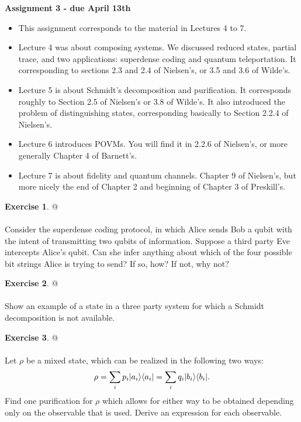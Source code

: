 \documentclass[12pt]{article}
\theoremstyle{plain}
\theoremstyle{definition}
\newtheorem{exerc}{Exercise}
\begin{document}
\begin{center}
\Large \textbf{{Assignment 3 - due April 13th}}
\end{center} 

\begin{itemize}

\item This assignment corresponds to the material in Lectures 4 to 7.

\item Lecture 4 was about composing systems. We discussed reduced states, partial trace, and two applications: superdense coding and quantum teleportation. It corresponding to sections 2.3 and 2.4 of Nielsen's, or 3.5 and 3.6 of Wilde's.
\item Lecture 5 is about Schmidt's decomposition and purification. It corresponds roughly to Section 2.5 of Nielsen's or 3.8 of Wilde's. It also introduced the problem of distinguishing states, corresponding basically to Section 2.2.4 of Nielsen's.
\item Lecture 6 introduces POVMs. You will find it in 2.2.6 of Nielsen's, or more generally Chapter 4 of Barnett's.
\item Lecture 7 is about fidelity and quantum channels. Chapter 9 of Nielsen's, but more nicely the end of Chapter 2 and beginning of Chapter 3 of Preskill's.
\end{itemize}

\newpage

\begin{exerc}@ \\ \ \\ 
Consider the superdense coding protocol, in which Alice sends Bob a qubit with the intent of transmitting two qubits of information. Suppose a third party Eve intercepts Alice's qubit. Can she infer anything about which of the four possible bit strings Alice is trying to send? If so, how? If not, why not?
\end{exerc}

\noindent \hrulefill

\begin{exerc}@ \\ \ \\
  Show an example of a state in a three party system for which a Schmidt decomposition is not available.
\end{exerc}

\noindent \hrulefill

\begin{exerc}@ \\ \ \\
  Let $\rho$ be a mixed state, which can be realized in the following two ways:
  \[
  	\rho = \sum_{i} p_i | a_i \rangle \langle a_i | = \sum_{i} q_i | b_i \rangle \langle b_i |.
  \]
  Find one purification for $\rho$ which allows for either way to be obtained depending only on the observable that is used. Derive an expression for each observable.
\end{exerc}
\end{document}
